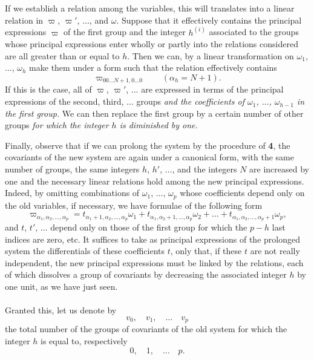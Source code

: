 \documentclass[leqno,11pt]{book}
\theoremstyle{shape1}
\theoremstyle{shapesmall}
\newcommand{\vp}{\varpi}
\begin{document}
If we establish a relation among the variables, this will translates into a linear relation in $\vp$, $\vp'$, $\dots$, and $\omega$. Suppose that it effectively contains the principal expressions $\vp$ of the first group and the integer $h^{(i)}$ associated to the groups whose principal expressions enter wholly or partly into the relations considered are all greater than or equal to $h$. Then we can, by a linear transformation on $\omega_{1}$, $\dots$, $\omega_{h}$ make them under a form such that the relation effectively contains
\[
\vp_{00\dots N+1,0\dots0}\qquad(\alpha_{h}=N+1).
\]
If this is the case, all of $\vp$, $\vp'$, $\dots$ are expressed in terms of the principal expressions of the second, third, $\dots$ groups \emph{and the coefficients of $\omega_{1}$, $\dots$, $\omega_{h-1}$ in the first group.} We can then replace the first group by a certain number of other groups \emph{for which the integer $h$ is diminished by one.}

Finally, observe that if we can prolong the system by the procedure of \textsection\textbf{4}, the covariants of the new system are again under a canonical form, with the same number of groups, the same integers $h$, $h'$, $\dots$, and the integers $N$ are increased by one and the necessary linear relations hold among the new principal expressions. Indeed, by omitting combinations of $\omega_{1}$, $\dots$, $\omega_{p}$ whose coefficients depend only on the old variables, if necessary, we have formulae of the following form
\[
\vp_{\alpha_{1},\alpha_{2},\dots,\alpha_{p}}=t_{\alpha_{1}+1,\alpha_{2},\dots,\alpha_{p}}\omega_{1}+t_{\alpha_{1},\alpha_{2}+1,\dots,\alpha_{p}}\omega_{2}+\dots+t_{\alpha_{1},\alpha_{2},\dots,\alpha_{p}+1}\omega_{p},
\]
and $t$, $t'$, $\dots$ depend only on those of the first group for which the $p-h$ last indices are zero, etc. It suffices to take as principal expressions of the prolonged system the differentials of these coefficients $t$, only that, if these $t$ are not really independent, the new principal expressions must be linked by the relations, each of which dissolves a group of covariants by decreasing the associated integer $h$ by one unit, as we have just seen.

\paragraph{}
\label{sec:p11}
Granted this, let us denote by
\[
v_{0},\quad v_{1},\quad \dots \quad v_{p}
\]
the total number of the groups of covariants of the old system for which the integer $h$ is equal to, respectively
\[
0,\quad 1,\quad \dots\quad p.
\]
\end{document}
